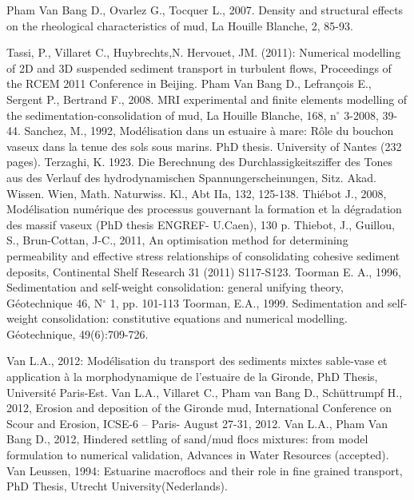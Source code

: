 Pham Van Bang D., Ovarlez G., Tocquer L., 2007. Density and structural
effects on the rheological characteristics of mud, La Houille Blanche, 2,
85-93.

Tassi, P., Villaret C., Huybrechts,N. Hervouet, JM. (2011): Numerical
modelling of 2D and 3D suspended sediment transport in turbulent flows,
Proceedings of the RCEM 2011 Conference in Beijing.\newline
Pham Van Bang D., Lefran\c{c}ois E., Sergent P., Bertrand F., 2008. MRI
experimental and finite elements modelling of the
sedimentation-consolidation of mud, La Houille Blanche, 168, n$^\circ$%
3-2008, 39-44.\newline
Sanchez, M., 1992, Mod\'{e}lisation dans un estuaire \`{a} mare: R\^{o}le du
bouchon vaseux dans la tenue des sols sous marins. PhD thesis. University of
Nantes (232 pages).\newline
Terzaghi, K. 1923. Die Berechnung des Durchlassigkeitsziffer des Tones aus
des Verlauf des hydrodynamischen Spannungerscheinungen, Sitz. Akad. Wissen.
Wien, Math. Naturwiss. Kl., Abt IIa, 132, 125-138.\newline
Thi\'{e}bot J., 2008, Mod\'{e}lisation num\'{e}rique des processus
gouvernant la formation et la d\'{e}gradation des massif vaseux (PhD thesis
ENGREF- U.Caen), 130 p. \newline
Thiebot, J., Guillou, S., Brun-Cottan, J-C., 2011, An optimisation method
for determining permeability and effective stress relationships of
consolidating cohesive sediment deposits, Continental Shelf Research 31
(2011) S117-S123.\newline
Toorman E. A., 1996, Sedimentation and self-weight consolidation: general
unifying theory, G\'{e}otechnique 46, N$^\circ$ 1, pp. 101-113\newline
Toorman, E.A., 1999. Sedimentation and self-weight consolidation:
constitutive equations and numerical modelling. G\'{e}otechnique,
49(6):709-726.

Van L.A., 2012: Mod\'{e}lisation du transport des sediments mixtes
sable-vase et application \`{a} la morphodynamique de l'estuaire de la
Gironde, PhD Thesis, Universit\'{e} Paris-Est.\newline
Van L.A., Villaret C., Pham van Bang D., Sch\"{u}ttrumpf H., 2012, Erosion
and deposition of the Gironde mud, International Conference on Scour and
Erosion, ICSE-6 -- Paris- August 27-31, 2012.\newline
Van L.A., Pham Van Bang D., 2012, Hindered settling of sand/mud flocs
mixtures: from model formulation to numerical validation, Advances in Water
Resources (accepted).\newline
Van Leussen, 1994: Estuarine macroflocs and their role in fine grained
transport, PhD Thesis, Utrecht University(Nederlands).

